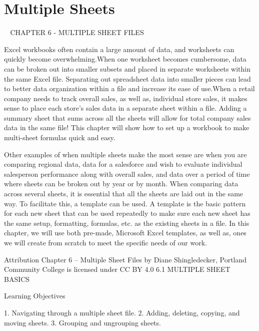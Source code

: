 \chapter{Multiple Sheets}\label{ch06:multiple_sheets}

                         CHAPTER 6 - MULTIPLE SHEET FILES



Excel workbooks often contain a large amount of data, and worksheets can quickly become
overwhelming.When one worksheet becomes cumbersome, data can be broken out into smaller
subsets and placed in separate worksheets within the same Excel file. Separating out spreadsheet data
into smaller pieces can lead to better data organization within a file and increase its ease of use.When
a retail company needs to track overall sales, as well as, individual store sales, it makes sense to place
each store’s sales data in a separate sheet within a file. Adding a summary sheet that sums across all
the sheets will allow for total company sales data in the same file! This chapter will show how to set
up a workbook to make multi-sheet formulas quick and easy.

Other examples of when multiple sheets make the most sense are when you are comparing regional
data, data for a salesforce and wish to evaluate individual salesperson performance along with overall
sales, and data over a period of time where sheets can be broken out by year or by month. When
comparing data across several sheets, it is essential that all the sheets are laid out in the same way.
To facilitate this, a template can be used. A template is the basic pattern for each new sheet that can
be used repeatedly to make sure each new sheet has the same setup, formatting, formulas, etc. as the
existing sheets in a file. In this chapter, we will use both pre-made, Microsoft Excel templates, as well
as, ones we will create from scratch to meet the specific needs of our work.


Attribution
Chapter 6 – Multiple Sheet Files by Diane Shingledecker, Portland Community College is licensed
under CC BY 4.0
6.1 MULTIPLE SHEET BASICS




Learning Objectives


1. Navigating through a multiple sheet file.
2. Adding, deleting, copying, and moving sheets.
3. Grouping and ungrouping sheets.




